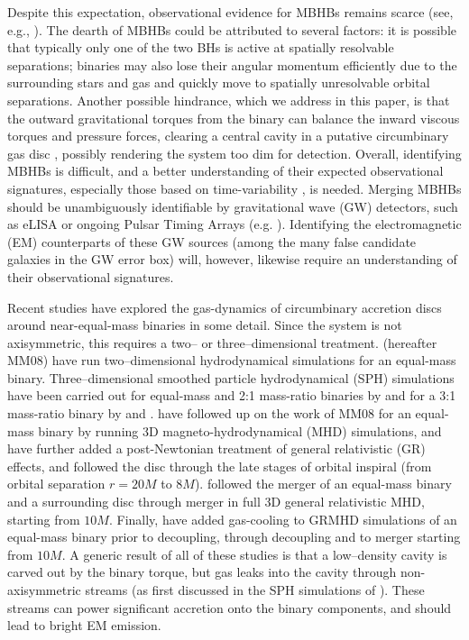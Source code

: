 Despite this expectation, observational evidence for MBHBs remains
scarce (see, e.g., \citealt{Komossa:Rev06,Tsalmantza:2011, Eracleous:2011}).
The dearth
of MBHBs could be attributed to several factors: it is possible that
typically only one of the two BHs is active at spatially resolvable
separations; binaries may also lose their angular momentum efficiently
due to the surrounding stars and gas and quickly move to spatially
unresolvable orbital separations.  Another possible hindrance, which
we address in this paper, is that the outward gravitational torques
from the binary can balance the inward viscous torques and pressure forces, 
clearing a central cavity in a putative circumbinary gas disc 
\citep{Artymowicz:1994}, possibly rendering the system too dim for
detection.  Overall, identifying MBHBs is difficult, and a better
understanding of their expected observational signatures, especially
those based on time-variability \citep{Haiman+2009}, is
needed. Merging MBHBs should be unambiguously identifiable by
gravitational wave (GW) detectors, such as eLISA \citep{eLISA:Amaro-Seoane:2012} or
ongoing Pulsar Timing Arrays (e.g. \citealt{PTAs}).  Identifying the
electromagnetic (EM) counterparts of these GW sources (among the many
false candidate galaxies in the GW error box) will, however, likewise
require an understanding of their observational signatures.

Recent studies have explored the gas-dynamics of circumbinary accretion
discs around near-equal-mass binaries in some detail.  Since the
system is not axisymmetric, this requires a two-- or
three--dimensional treatment.  \cite{MacFadyen:2008} (hereafter MM08)
have run two--dimensional hydrodynamical simulations for an equal-mass
binary. Three--dimensional smoothed particle hydrodynamical (SPH)
simulations have been carried out for equal-mass and 2:1 mass-ratio
binaries by \cite{Hayasaki:2007} and for a 3:1 mass-ratio binary by
\cite{Cuadra:2009} and \cite{Roedig:2012}.
\cite{ShiKrolik:2012} have followed up on the work of MM08 for an
equal-mass binary by running 3D magneto-hydrodynamical (MHD)
simulations, and \cite{Noble+2012} have further added a post-Newtonian
treatment of general relativistic (GR) effects, and followed the disc
through the late stages of orbital inspiral (from orbital separation
$r=20M$ to $8M$).  \cite{FarrisShap:2011} followed the merger of an
equal-mass binary and a surrounding disc through merger in full 3D
general relativistic MHD, starting from $10M$. Finally,
\cite{FarrisGold:2012} have added gas-cooling to GRMHD simulations of an
equal-mass binary prior to decoupling, through decoupling and to
merger starting from $10M$.  A generic result of all of these studies
is that a low--density cavity is carved out by the binary torque, but
gas leaks into the cavity through non-axisymmetric streams 
(as first discussed in the SPH simulations of \citealt{ArtyLubow:1996}).  These
streams can power significant accretion onto the binary components,
and should lead to bright EM emission.

